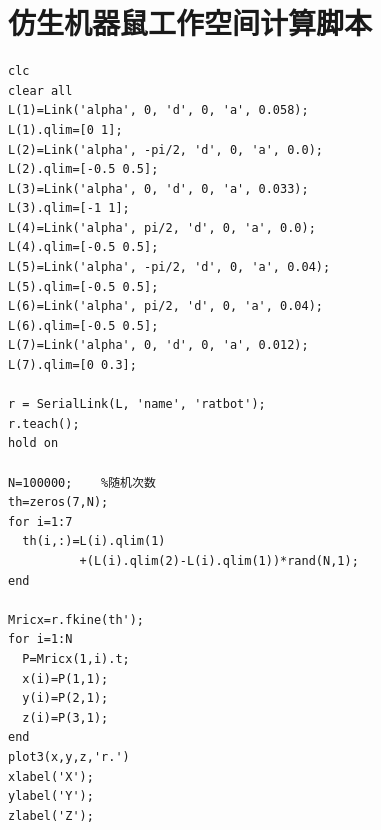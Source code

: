 %
%
%
%
%
%

\renewcommand{\thechapter}{附录}


\section{仿生机器鼠工作空间计算脚本}\label{appendix_wsscripts}
{\renewcommand\baselinestretch{1.0}\selectfont
{\setmainfont{Courier New Bold}                          %
\begin{lstlisting}
clc
clear all
L(1)=Link('alpha', 0, 'd', 0, 'a', 0.058);
L(1).qlim=[0 1];
L(2)=Link('alpha', -pi/2, 'd', 0, 'a', 0.0);
L(2).qlim=[-0.5 0.5];
L(3)=Link('alpha', 0, 'd', 0, 'a', 0.033);
L(3).qlim=[-1 1];
L(4)=Link('alpha', pi/2, 'd', 0, 'a', 0.0);
L(4).qlim=[-0.5 0.5];
L(5)=Link('alpha', -pi/2, 'd', 0, 'a', 0.04);
L(5).qlim=[-0.5 0.5];
L(6)=Link('alpha', pi/2, 'd', 0, 'a', 0.04);
L(6).qlim=[-0.5 0.5];
L(7)=Link('alpha', 0, 'd', 0, 'a', 0.012);
L(7).qlim=[0 0.3];

r = SerialLink(L, 'name', 'ratbot');
r.teach();
hold on

N=100000;    %随机次数
th=zeros(7,N);
for i=1:7
  th(i,:)=L(i).qlim(1)
          +(L(i).qlim(2)-L(i).qlim(1))*rand(N,1);
end

Mricx=r.fkine(th');
for i=1:N
  P=Mricx(1,i).t;
  x(i)=P(1,1);
  y(i)=P(2,1);
  z(i)=P(3,1);
end
plot3(x,y,z,'r.')
xlabel('X');
ylabel('Y');
zlabel('Z');
\end{lstlisting}}
\par}


